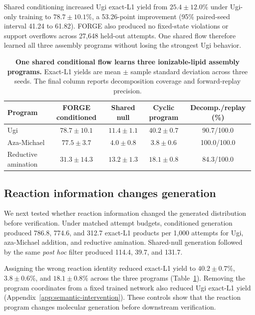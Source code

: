 \documentclass{article}
\newcommand{\ForgeUgiRetentionCIHighPP}{61.82}
\newcommand{\ForgeUgiRetentionCILowPP}{41.24}
\newcommand{\ForgeUgiRetentionDifferencePP}{53.26}
\begin{document}
Shared conditioning increased Ugi exact-L1 yield from $25.4\pm12.0\%$ under Ugi-only training to $78.7\pm10.1\%$, a \ForgeUgiRetentionDifferencePP-point improvement (95\% paired-seed interval \ForgeUgiRetentionCILowPP{} to \ForgeUgiRetentionCIHighPP). FORGE also produced no fixed-state violations or support overflows across 27,648 held-out attempts. One shared flow therefore learned all three assembly programs without losing the strongest Ugi behavior.

\begin{table}[h!]
\centering
\caption{\textbf{One shared conditional flow learns three ionizable-lipid assembly programs.}
Exact-L1 yields are mean $\pm$ sample standard deviation across three seeds. The final column reports decomposition coverage and forward-replay precision.}
\label{tab:gem-shared-programs}
\small
\setlength{\tabcolsep}{4.6pt}
\begin{tabular}{@{}lcccc@{}}
\toprule
Program & FORGE conditioned & Shared null & Cyclic program & Decomp./replay (\%) \\
\midrule
Ugi & $78.7\pm10.1$ & $11.4\pm1.1$ & $40.2\pm0.7$ & 90.7/100.0 \\
Aza-Michael & $77.5\pm3.7$ & $4.0\pm0.8$ & $3.8\pm0.6$ & 100.0/100.0 \\
Reductive amination & $31.3\pm14.3$ & $13.2\pm1.3$ & $18.1\pm0.8$ & 84.3/100.0 \\
\bottomrule
\end{tabular}
\end{table}

\subsection{Reaction information changes generation}

We next tested whether reaction information changed the generated distribution before verification. Under matched attempt budgets, conditioned generation produced 786.8, 774.6, and 312.7 exact-L1 products per 1,000 attempts for Ugi, aza-Michael addition, and reductive amination. Shared-null generation followed by the same \textit{post hoc} filter produced 114.4, 39.7, and 131.7.

Assigning the wrong reaction identity reduced exact-L1 yield to $40.2\pm0.7\%$, $3.8\pm0.6\%$, and $18.1\pm0.8\%$ across the three programs (Table~\ref{tab:gem-shared-programs}). Removing the program coordinates from a fixed trained network also reduced Ugi exact-L1 yield (Appendix~\ref{app:semantic-intervention}). These controls show that the reaction program changes molecular generation before downstream verification.
\end{document}
